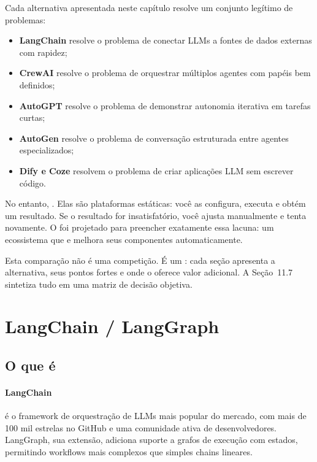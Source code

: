 Cada alternativa apresentada neste capítulo resolve um conjunto legítimo de
problemas:

\begin{itemize}
    \item \textbf{LangChain} resolve o problema de conectar LLMs a fontes
          de dados externas com rapidez;
    \item \textbf{CrewAI} resolve o problema de orquestrar múltiplos
          agentes com papéis bem definidos;
    \item \textbf{AutoGPT} resolve o problema de demonstrar autonomia
          iterativa em tarefas curtas;
    \item \textbf{AutoGen} resolve o problema de conversação estruturada
          entre agentes especializados;
    \item \textbf{Dify e Coze} resolvem o problema de criar aplicações
          LLM sem escrever código.
\end{itemize}

No entanto, . Elas são plataformas estáticas: você as configura, executa e
obtém um resultado. Se o resultado for insatisfatório, você ajusta
manualmente e tenta novamente. O \opencodeeco{} foi projetado para
preencher exatamente essa lacuna: um ecossistema que  e melhora seus componentes automaticamente.

Esta comparação não é uma competição. É um :
cada seção apresenta a alternativa, seus pontos fortes e onde o
\opencodeeco{} oferece valor adicional. A Seção~11.7 sintetiza tudo em uma
matriz de decisão objetiva.

\section{LangChain / LangGraph}
\label{sec:langchain}
\nivelbasico

\subsection{O que é}

\paragraph{LangChain} é o framework de orquestração de LLMs mais popular do
mercado, com mais de 100 mil estrelas no GitHub e uma comunidade ativa de
desenvolvedores. LangGraph, sua extensão, adiciona suporte a grafos de
execução com estados, permitindo workflows mais complexos que simples chains
lineares.

